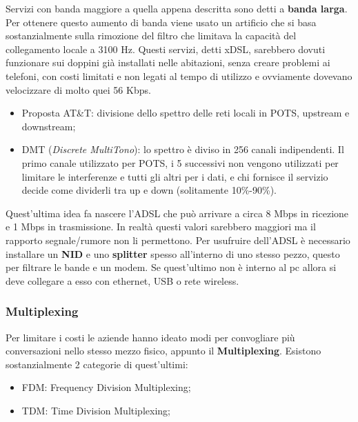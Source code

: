 Servizi con banda maggiore a quella appena descritta sono detti a \textbf{banda larga}. Per ottenere questo aumento di banda viene usato un artificio che si basa sostanzialmente sulla rimozione del filtro che limitava la capacità del collegamento locale a 3100 Hz. Questi servizi, detti xDSL, sarebbero dovuti funzionare sui doppini già installati nelle abitazioni, senza creare problemi ai telefoni, con costi limitati e non legati al tempo di utilizzo e ovviamente dovevano velocizzare di molto quei 56 Kbps. 

\begin{itemize}

\item{Proposta AT\&T: divisione dello spettro delle reti locali in POTS, upstream e downstream};
\item{DMT (\textit{Discrete MultiTono}): lo spettro è diviso in 256 canali indipendenti. Il primo canale utilizzato per POTS, i 5 successivi non vengono utilizzati per limitare le interferenze e tutti gli altri per i dati, e chi fornisce il servizio decide come dividerli tra up e down (solitamente 10\%-90\%)}.

\end{itemize}

Quest'ultima idea fa nascere l'ADSL che può arrivare a circa 8 Mbps in ricezione e 1 Mbps in trasmissione. In realtà questi valori sarebbero maggiori ma il rapporto segnale/rumore non li permettono. Per usufruire dell'ADSL è necessario installare un \textbf{NID} e uno \textbf{splitter} spesso all'interno di uno stesso pezzo, questo per filtrare le bande e un modem. Se quest'ultimo non è interno al pc allora si deve collegare a esso con ethernet, USB o rete wireless.

\subsubsection{Multiplexing}

Per limitare i costi le aziende hanno ideato modi per convogliare più conversazioni nello stesso mezzo fisico, appunto il\textbf{ Multiplexing}. Esistono sostanzialmente 2 categorie di quest'ultimi:

\begin{itemize}

\item{FDM: Frequency Division Multiplexing};
\item{TDM: Time Division Multiplexing};

\end{itemize}

